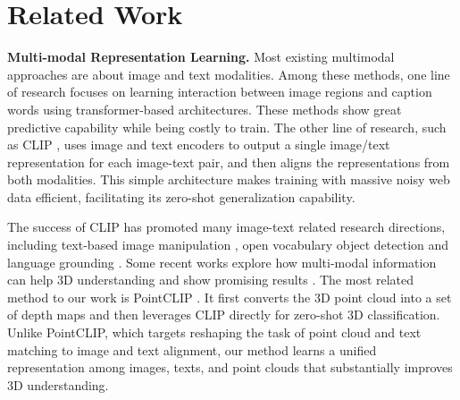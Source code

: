 \section{Related Work}
\label{sec:related work}
\noindent\textbf{Multi-modal Representation Learning.}
Most existing multimodal approaches are about image and text modalities. 
Among these methods, one line of research focuses on learning interaction between image regions and caption words \cite{tan2019lxmert,chen2020uniter,li2020oscar,lu2019vilbert,li2019visualbert,li2021align} using transformer-based architectures. These methods show great predictive capability while being costly to train. 
The other line of research, such as CLIP \cite{radford2021learning}, uses image and text encoders to output a single image/text representation for each image-text pair, and then aligns the representations from both modalities. This simple architecture makes training with massive noisy web data efficient, facilitating its zero-shot generalization capability.

The success of CLIP has promoted many image-text related research directions, including text-based image manipulation \cite{patashnik2021styleclip}, open vocabulary object detection \cite{gu2021open,gao2021towards} and language grounding \cite{li2022grounded}. Some recent works explore how multi-modal information can help 3D understanding and show promising results \cite{yan2022let, chen2021multimodal}. The most related method to our work is PointCLIP \cite{zhang2022pointclip}. It first converts the 3D point cloud into a set of depth maps and then leverages CLIP directly for zero-shot 3D classification. Unlike PointCLIP, which targets reshaping the task of point cloud and text matching to image and text alignment, our method learns a unified representation among images, texts, and point clouds that substantially improves 3D understanding.

